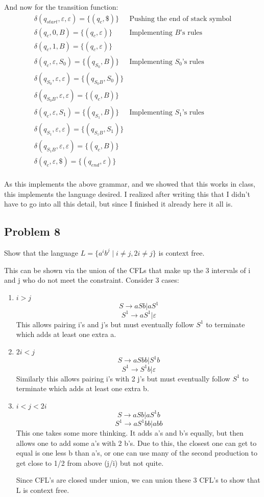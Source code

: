 \documentclass[english]{article}
\begin{document}
And now for the transition function:
\begin{align*}
\delta(q_{start},\varepsilon,\varepsilon) = \{(q_{c},\$)\} & \textrm{Pushing the end of stack symbol} \\
\delta(q_{c},0,B) = \{(q_{c},\varepsilon)\} & \textrm{Implementing $B$'s rules} \\
\delta(q_{c},1,B) = \{(q_{c},\varepsilon)\}  \\
\delta(q_{c},\varepsilon,S_0) = \{(q_{S_0},B)\} & \textrm{Implementing $S_0$'s rules} \\
\delta(q_{S_0},\varepsilon,\varepsilon) = \{(q_{S_0B},S_0)\}  \\
\delta(q_{S_0B},\varepsilon,\varepsilon) = \{(q_{c},B)\}  \\
\delta(q_{c},\varepsilon,S_1) = \{(q_{S_1},B)\} & \textrm{Implementing $S_1$'s rules} \\
\delta(q_{S_1},\varepsilon,\varepsilon) = \{(q_{S_1B},S_1)\}  \\
\delta(q_{S_1B},\varepsilon,\varepsilon) = \{(q_{c},B)\}  \\
\delta(q_{c},\varepsilon,\$) = \{(q_{end},\varepsilon)\}  \\
\end{align*}

As this implements the above grammar, and we showed that this works in class, this implements the language
desired. I realized after writing this that I didn't have to go into all this detail, but since I finished
it already here it all is.

\subsection*{Problem 8}
Show that the language \(L = \{a^i b^j \mid i \neq j, 2i \neq j\}\) is context free.

This can be shown via the union of the CFLs that make up the 3 intervals of i and j who do not meet the constraint. Consider 3 cases:
\begin{enumerate}
\item \(i > j\)
\[ S \rightarrow aSb | aS^1 \]
\[ S^1 \rightarrow aS^1 | \varepsilon \]
This allows pairing i's and j's but must eventually follow $S^1$ to terminate which adds at least one extra a.

\item \(2i < j\)
\[ S \rightarrow aSbb | S^1b \]
\[ S^1 \rightarrow S^1b | \varepsilon \]
Similarly this allows pairing i's with 2 j's but must eventually follow $S^1$ to terminate which adds at least one extra b.

\item \(i < j < 2i\)
\[ S \rightarrow  aSb | aS^1b \]
\[ S^1 \rightarrow  aS^1bb | abb \]
This one takes some more thinking. It adds a's and b's equally, but then allows one to add some a's with 2 b's. Due to this, the closest one can get to equal is one less b than a's, or one can use many of the second production to get close to 1/2 from above (j/i) but not quite.

Since CFL's are closed under union, we can union these 3 CFL's to show that L is context free.

\end{enumerate}
\end{document}

